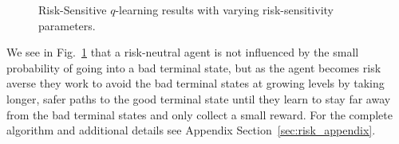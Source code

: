 \documentclass{article}
\begin{document}
\vspace{-2mm}
\begin{figure}[H]
    \centering
    \vfill
    \caption{Risk-Sensitive $q$-learning results with varying risk-sensitivity parameters.}
    \label{fig:risk}
\end{figure}
\vspace{-2mm}
We see in Fig.~\ref{fig:risk} that a risk-neutral agent is not influenced by the small probability of going into a bad terminal state, but as the agent becomes risk averse they work to avoid the bad terminal states at growing levels by taking longer, safer paths to the good terminal state until they learn to stay far away from the bad terminal states and only collect a small reward. For the complete algorithm and additional details see Appendix Section~\ref{sec:risk_appendix}.
\end{document}
